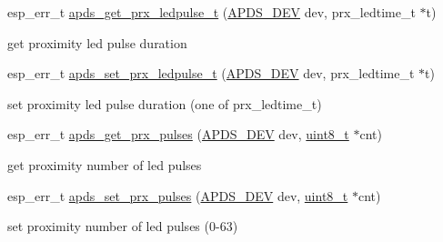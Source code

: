 \begin{DoxyCompactItemize}
esp\+\_\+err\+\_\+t \hyperlink{group__APDS9960__ProximityFunctions_gadfe27306164fc3570a5e0dd4a05381bd}{apds\+\_\+get\+\_\+prx\+\_\+ledpulse\+\_\+t} (\hyperlink{structAPDS9960__Driver}{A\+P\+D\+S\+\_\+\+D\+EV} dev, prx\+\_\+ledtime\+\_\+t $\ast$t)
\begin{DoxyCompactList}\small\item\em 
\begin{DoxyItemize}
\item get proximity led pulse duration 
\end{DoxyItemize}\end{DoxyCompactList}\item 
esp\+\_\+err\+\_\+t \hyperlink{group__APDS9960__ProximityFunctions_ga112a924f037335d95b65e46e47882601}{apds\+\_\+set\+\_\+prx\+\_\+ledpulse\+\_\+t} (\hyperlink{structAPDS9960__Driver}{A\+P\+D\+S\+\_\+\+D\+EV} dev, prx\+\_\+ledtime\+\_\+t $\ast$t)
\begin{DoxyCompactList}\small\item\em 
\begin{DoxyItemize}
\item set proximity led pulse duration (one of prx\+\_\+ledtime\+\_\+t) 
\end{DoxyItemize}\end{DoxyCompactList}\item 
esp\+\_\+err\+\_\+t \hyperlink{group__APDS9960__ProximityFunctions_gab3badaf46315c85ec711221e11fca63a}{apds\+\_\+get\+\_\+prx\+\_\+pulses} (\hyperlink{structAPDS9960__Driver}{A\+P\+D\+S\+\_\+\+D\+EV} dev, \hyperlink{vl53l0x__types_8h_aba7bc1797add20fe3efdf37ced1182c5}{uint8\+\_\+t} $\ast$cnt)
\begin{DoxyCompactList}\small\item\em 
\begin{DoxyItemize}
\item get proximity number of led pulses 
\end{DoxyItemize}\end{DoxyCompactList}\item 
esp\+\_\+err\+\_\+t \hyperlink{group__APDS9960__ProximityFunctions_ga5b6df0f58c5eb5d26cc094c2f8284778}{apds\+\_\+set\+\_\+prx\+\_\+pulses} (\hyperlink{structAPDS9960__Driver}{A\+P\+D\+S\+\_\+\+D\+EV} dev, \hyperlink{vl53l0x__types_8h_aba7bc1797add20fe3efdf37ced1182c5}{uint8\+\_\+t} $\ast$cnt)
\begin{DoxyCompactList}\small\item\em 
\begin{DoxyItemize}
\item set proximity number of led pulses (0-\/63) 

\end{DoxyItemize}
\end{DoxyCompactList}
\end{DoxyCompactItemize}
